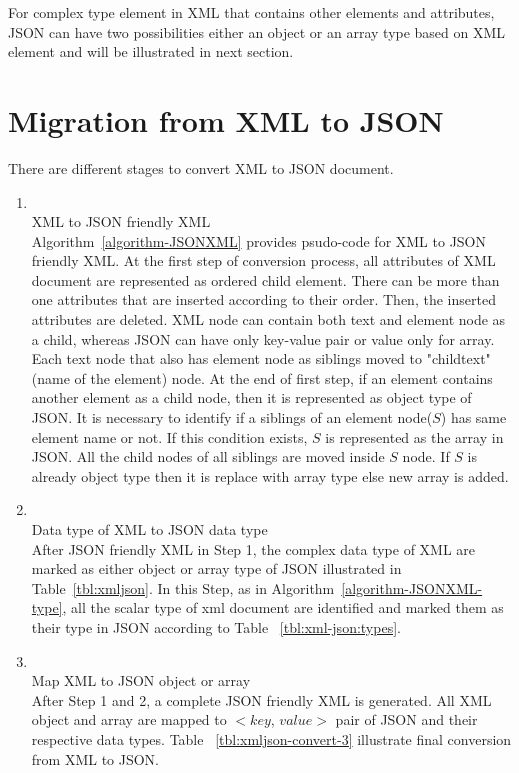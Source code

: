For complex type element in XML that contains other elements and attributes, JSON can have two possibilities either an object or an array type based on XML element and will be illustrated in next section.

\section{Migration from XML to JSON}\label{xml-to-json-migration}
There are different stages to convert XML to JSON document.
\begin{enumerate}[label=Step\arabic*.]
	\item~\\
	XML to JSON friendly XML \\
	Algorithm~\ref{algorithm-JSONXML} provides psudo-code for XML to JSON friendly XML. At the first step of conversion process, all attributes of XML document are represented as ordered child element. There can be more than one attributes that are inserted according to their order. Then, the inserted attributes are deleted.  XML node can contain both text and element node as a child, whereas JSON can have only key-value pair or value only for array. Each text node that also has element node as siblings moved to "childtext"(name of the element) node. At the end of first step, if an element contains another element as a child node, then it is represented as object type of JSON. It is necessary to identify if a siblings of an element node($S$) has same element name or not. If this condition exists, $S$ is represented as the array in JSON. All the child nodes of all siblings are moved inside $S$ node. If $S$ is already  object type  then it is replace with array type  else new array is added. %
	
	\item~\\
	Data type of XML to JSON data type\\
	After JSON friendly XML in Step 1, the complex data type of XML are marked as either object or array type of JSON illustrated in Table~\ref{tbl:xmljson}. In this Step,  as in 
	Algorithm~\ref{algorithm-JSONXML-type}, all the scalar type of xml document are identified and marked them as their type in JSON according to Table ~\ref{tbl:xml-json:types}.
	\item~\\
	Map XML to JSON object or array\\
	After Step 1 and 2, a complete JSON friendly XML is generated. All XML object and array are mapped to $<$$key$, $value$$>$ pair of JSON and their respective data types. Table ~\ref{tbl:xmljson-convert-3} illustrate final conversion from XML to JSON.
\end{enumerate}

